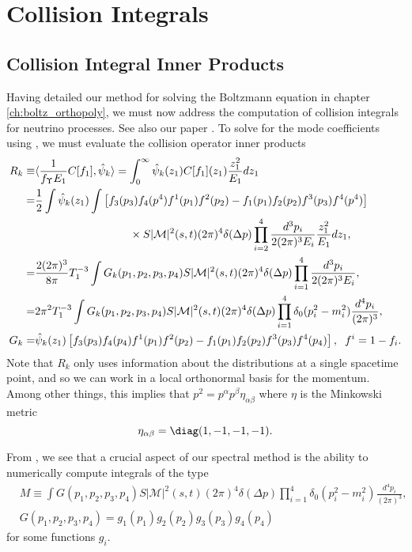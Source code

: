 
\chapter{ Collision Integrals}\label{ch:coll_simp}


\section{Collision Integral Inner Products}\label{coll_simp_sec}
Having detailed our method for solving the Boltzmann equation in chapter \ref{ch:boltz_orthopoly}, we must now address the computation of  collision integrals for neutrino processes.   See also our paper \cite{Birrell:2014uka}. To solve for the mode coefficients using , we must evaluate the collision operator inner products
\begin{align}\label{collision_integrals}
R_k\equiv&\langle\frac{1}{f_\Upsilon E_1}C[f_1],\hat\psi_k\rangle=\int_0^\infty \hat\psi_k(z_1)C[f_1](z_1) \frac{z_1^2}{E_1}dz_1\\
=&\frac{1}{2}\int \hat\psi_k(z_1)\int\left[f_3(p_3)f_4(p^4)f^1(p_1)f^2(p_2)-f_1(p_1)f_2(p_2)f^3(p_3)f^4(p^4)\right]\\
&\hspace{30mm}\times S |\mathcal{M}|^2(s,t)(2\pi)^4\delta(\Delta p)\prod_{i=2}^4\frac{d^{3}p_i}{2(2\pi)^3E_i}\frac{z_1^2}{E_1}dz_1,\notag\\
=&\frac{2(2\pi)^3}{8\pi}T_1^{-3}\int G_k(p_1,p_2,p_3,p_4)S |\mathcal{M}|^2(s,t)(2\pi)^4\delta(\Delta p)\prod_{i=1}^4\frac{d^{3}p_i}{2(2\pi)^3E_i},\\
=&2\pi^2T_1^{-3}\int G_k(p_1,p_2,p_3,p_4)S |\mathcal{M}|^2(s,t)(2\pi)^4\delta(\Delta p)\prod_{i=1}^4 \delta_0(p_i^2-m_i^2)\frac{d^4p_i}{(2\pi)^3},\\
G_k=&\hat\psi_k(z_1)\left[f_3(p_3)f_4(p_4)f^1(p_1)f^2(p_2)-f_1(p_1)f_2(p_2)f^3(p_3)f^4(p_4)\right],\hspace{2mm} f^i=1- f_i.
\end{align}
Note that $R_k$ only uses information about the distributions at a single spacetime point, and so we can work in a local orthonormal basis for the momentum.  Among other things, this implies that $p^2=p^\alpha p^\beta\eta_{\alpha\beta}$ where $\eta$ is the Minkowski metric
\begin{equation}
\eta_{\alpha\beta}=\diag(1,-1,-1,-1).
\end{equation}

From , we see that a crucial aspect of our spectral method is the ability to numerically compute  integrals of the type
\begin{align}\label{coll_ip}
&M\equiv\int G(p_1,p_2,p_3,p_4) S |\mathcal{M}|^2(s,t) (2\pi)^4\delta(\Delta p)\prod_{i=1}^4 \delta_0(p_i^2-m_i^2)\frac{d^4p_i}{(2\pi)^3},\\
&G(p_1,p_2,p_3,p_4)=g_1(p_1)g_2(p_2)g_3(p_3)g_4(p_4)
\end{align}
for some functions $g_i$.

